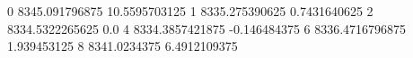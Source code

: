 0 8345.091796875 10.5595703125
1 8335.275390625 0.7431640625
2 8334.5322265625 0.0
4 8334.3857421875 -0.146484375
6 8336.4716796875 1.939453125
8 8341.0234375 6.4912109375

